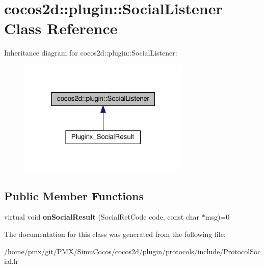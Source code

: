 \hypertarget{classcocos2d_1_1plugin_1_1SocialListener}{}\section{cocos2d\+:\+:plugin\+:\+:Social\+Listener Class Reference}
\label{classcocos2d_1_1plugin_1_1SocialListener}


Inheritance diagram for cocos2d\+:\+:plugin\+:\+:Social\+Listener\+:
\nopagebreak
\begin{figure}[H]
\begin{center}
\leavevmode
\includegraphics[width=232pt]{classcocos2d_1_1plugin_1_1SocialListener__inherit__graph}
\end{center}
\end{figure}
\subsection*{Public Member Functions}
\begin{DoxyCompactItemize}
\item 
\mbox{\label{classcocos2d_1_1plugin_1_1SocialListener_a2d4ea442b5f71354d29fce84759c3ea0}} 
virtual void {\bfseries on\+Social\+Result} (Social\+Ret\+Code code, const char $\ast$msg)=0
\end{DoxyCompactItemize}


The documentation for this class was generated from the following file\+:\begin{DoxyCompactItemize}
\item 
/home/pmx/git/\+P\+M\+X/\+Simu\+Cocos/cocos2d/plugin/protocols/include/Protocol\+Social.\+h\end{DoxyCompactItemize}

